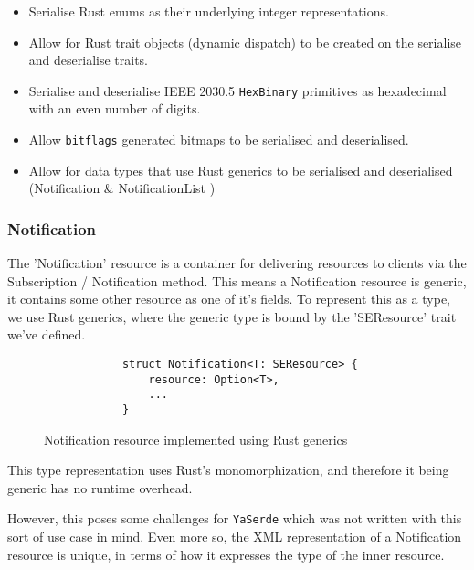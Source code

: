 \begin{itemize}
    \item Serialise Rust enums as their underlying integer representations.
    \item Allow for Rust trait objects (dynamic dispatch) to be created on the serialise and deserialise traits.
    \item Serialise and deserialise IEEE 2030.5 \texttt{HexBinary} primitives as hexadecimal with an even number of digits. 
    \item Allow \texttt{bitflags} generated bitmaps to be serialised and deserialised.
    \item Allow for data types that use Rust generics to be serialised and deserialised (Notification \& NotificationList )
\end{itemize}

\subsubsection{Notification}
The 'Notification' resource is a container for delivering resources to clients via the Subscription / Notification method. This means a Notification resource is generic, it contains some other resource as one of it's fields. To represent this as a type, we use Rust generics, where the generic type is bound by the 'SEResource' trait we've defined.

\begin{figure}[H]
    \begin{center}
        \begin{lstlisting}
            struct Notification<T: SEResource> {
                resource: Option<T>,
                ...
            }
        \end{lstlisting}
        \label{fig:notifgeneric}
        \caption{Notification resource implemented using Rust generics}
    \end{center}
\end{figure}

This type representation uses Rust's monomorphization, and therefore it being generic has no runtime overhead.

However, this poses some challenges for \texttt{YaSerde} which was not written with this sort of use case in mind. Even more so, the XML representation of a Notification resource is unique, in terms of how it expresses the type of the inner resource.

